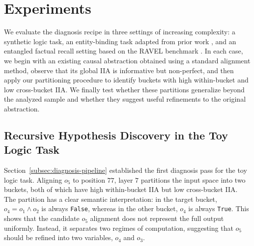 \section{Experiments}

We evaluate the diagnosis recipe in three settings of increasing complexity: a synthetic logic task, an entity-binding task adapted from prior work \citep{gur2025mixing}, and an entangled factual recall setting based on the RAVEL benchmark \citep{huang2024ravel}. In each case, we begin with an existing causal abstraction obtained using a standard alignment method, observe that its global IIA is informative but non-perfect, and then apply our partitioning procedure to identify buckets with high within-bucket and low cross-bucket IIA. We finally test whether these partitions generalize beyond the analyzed sample and whether they suggest useful refinements to the original abstraction.

\subsection{Recursive Hypothesis Discovery in the Toy Logic Task}
\label{sec:logic-task-recursive}

Section~\ref{subsec:diagnosis-pipeline} established the first diagnosis pass for the toy logic task. Aligning \(o_5\) to position \(77\), layer \(7\) partitions the input space into two buckets, both of which have high within-bucket IIA but low cross-bucket IIA. The partition has a clear semantic interpretation: in the target bucket, \(o_4=o_1\wedge o_2\) is always \texttt{False}, whereas in the other bucket, \(o_4\) is always \texttt{True}. This shows that the candidate \(o_5\) alignment does not represent the full output uniformly. Instead, it separates two regimes of computation, suggesting that \(o_5\) should be refined into two variables, \(o_4\) and \(o_3\).

